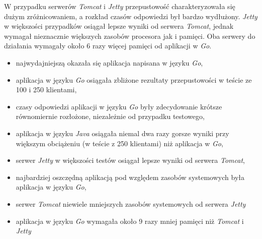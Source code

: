 W przypadku serwerów \textsl{Tomcat} i \textsl{Jetty} przepustowość charakteryzowała się dużym zróżnicowaniem, a rozkład czasów odpowiedzi był bardzo wydłużony. \textsl{Jetty} w większości przypadków osiągał lepsze wyniki od serwera \textsl{Tomcat}, jednak wymagał nieznacznie większych zasobów procesora jak i pamięci. Oba serwery do działania wymagały około 6 razy więcej pamięci od aplikacji w \textsl{Go}. 


\begin{itemize}
    \item najwydajniejszą  okazała się aplikacja napisana w języku \textsl{Go},
    \item aplikacja w języku \textsl{Go} osiągała zbliżone rezultaty przepustowości w teście ze 100 i 250 klientami,
    \item czasy odpowiedzi aplikacji w języku \textsl{Go} były zdecydowanie krótsze równomiernie rozłożone, niezależnie od przypadku testowego,
    \item aplikacja w języku \textsl{Java} osiągała niemal dwa razy gorsze wyniki przy większym obciążeniu (w teście z 250 klientami) niż aplikacja w \textsl{Go},
    \item serwer \textsl{Jetty} w większości testów osiągał lepsze wyniki od serwera \textsl{Tomcat}, 
    \item najbardziej oszczędną aplikacją pod względem zasobów systemowych była aplikacja w języku \textsl{Go},
    \item serwer \textsl{Tomcat} niewiele mniejszych zasobów systemowych od serwera \textsl{Jetty}
    \item aplikacja w języku \textsl{Go} wymagała około 9 razy mniej pamięci niż \textsl{Tomcat} i \textsl{Jetty}
\end{itemize}
